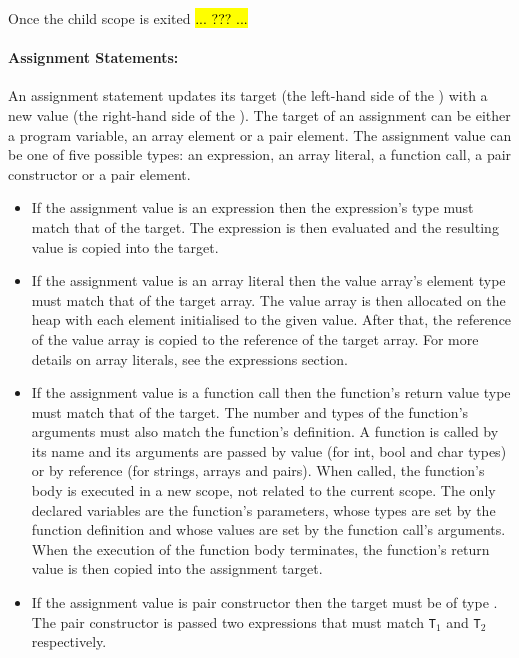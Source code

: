 \documentclass[a4paper]{article}
\theoremstyle{definition}
\newtheorem{question}{Gap}
\newcommand{\fillgap}[2]{
  \begin{center}
  \fbox{
    \begin{minipage}{4in}
      \begin{question}
        {\it #1} \hfill ({\bf #2})
      \end{question}
    \end{minipage}
  }
\end{center}
}
\begin{document}
Once the child scope is exited \hl{... ??? ...}

\fillgap{\hl{Complete the above paragraph}}{5 marks}

\paragraph{Assignment Statements:}
An assignment statement updates its target (the left-hand side of the \lit{=}) with a new value (the right-hand side of the \lit{=}).
The target of an assignment can be either a program variable, an array element or a pair element.
The assignment value can be one of five possible types: an expression, an array literal, a function call, a pair constructor or a pair element.
\begin{itemize}
 \item If the assignment value is an expression  then the expression's type must match that of the target.
       The expression is then evaluated and the resulting value is copied into the target.
 \item If the assignment value is an array literal  then the value array's element type must match that of the target array.
       The value array is then allocated on the heap with each element initialised to the given value. After that, the reference of the value array is copied to the reference of the target array.
       For more details on array literals, see the expressions section.
 \item If the assignment value is a function call  then the function's return value type must match that of the target.
       The number and types of the function's arguments must also match the function's definition.
       A function is called by its name and its arguments are passed by value (for int, bool and char types) or by reference (for strings, arrays and pairs).
       When called, the function's body is executed in a new scope, not related to the current scope.
       The only declared variables are the function's parameters, whose types are set by the function definition and whose values are set by the function call's arguments.
       When the execution of the function body terminates, the function's return value is then copied into the assignment target.
 \item If the assignment value is pair constructor  then the target must be of type .
       The pair constructor is passed two expressions that must match {\tt T}$_1$ and {\tt T}$_2$ respectively.

\end{itemize}
\end{document}
